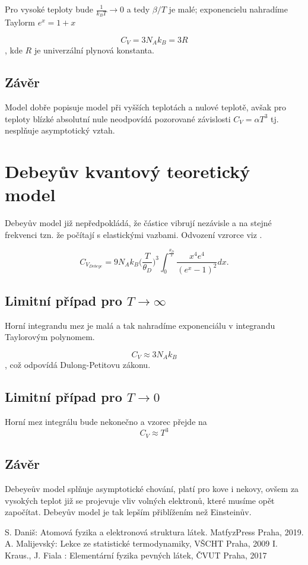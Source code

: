  Pro vysoké teploty bude $\frac{1}{k_B T} \to 0$ a tedy $\beta/T$ je malé; exponencielu nahradíme Taylorm $e^x = 1 + x$
 
 $$
    C_V = 3N_A k_B = 3R
$$
, kde $R$ je univerzální plynová konstanta.  

\subsection*{Závěr} 

Model dobře popisuje model při vyšších teplotách a nulové teplotě, avšak pro teploty blízké absolutní nule neodpovídá pozorované závislosti $C_V = \alpha T^3$ tj. nesplňuje asymptotický vztah.

\section{Debeyův kvantový teoretický model}

Debeyův model již nepředpokládá, že částice vibrují nezávisle a na stejné frekvenci tzn. že počítají s elastickými vazbami. Odvození vzrorce viz \cite{Danis2019}.

\begin{equation}
    C_V_{Debeye} = 9N_Ak_B \Big(\frac{T}{\theta_D}\Big)^3 \int_{0}^{\frac{\theta_D}{T}}  \frac{x^4 e^4}{(e^x - 1)^2} dx.
\end{equation}

\subsection*{Limitní případ pro $T \to \infty$}

Horní integrandu mez je malá a tak nahradíme exponenciálu v integrandu Taylorovým polynomem.

$$
C_V \approx 3N_A k_B
$$
, což odpovídá Dulong-Petitovu zákonu.

\subsection*{Limitní případ pro $T \to 0$}

Horní mez integrálu bude nekonečno a vzorec přejde na
$$
C_V \approx T^3
$$

\subsection*{Závěr}

Debeyeův model splňuje asymptotické chování, platí pro kove i nekovy, ovšem za vysokých teplot již se projevuje vliv volných elektronů, které musíme opět započítat. Debeyův model je tak lepším přiblížením než Einsteinův.

\begin{thebibliography}{}

 S. Daniš: Atomová fyzika a elektronová struktura látek. MatfyzPress Praha, 2019.
 A. Malijevský: Lekce ze statistické termodynamiky, VŠCHT Praha, 2009
 I. Kraus., J. Fiala : Elementární fyzika pevných látek, ČVUT Praha, 2017
\end{thebibliography}